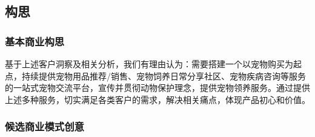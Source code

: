 \documentclass[a4paper]{ctexart}
\begin{document}
\subsection{构思}

\subsubsection{基本商业构思}

基于上述客户洞察及相关分析，我们有理由认为：需要搭建一个以宠物购买为起点，持续提供宠物用品推荐/销售、宠物饲养日常分享社区、宠物疾病咨询等服务的一站式宠物交流平台，宣传并贯彻动物保护理念，提供宠物领养服务。通过提供上述多种服务，切实满足各类客户的需求，解决相关痛点，体现产品初心和价值。

\subsubsection{候选商业模式创意}
\end{document}
